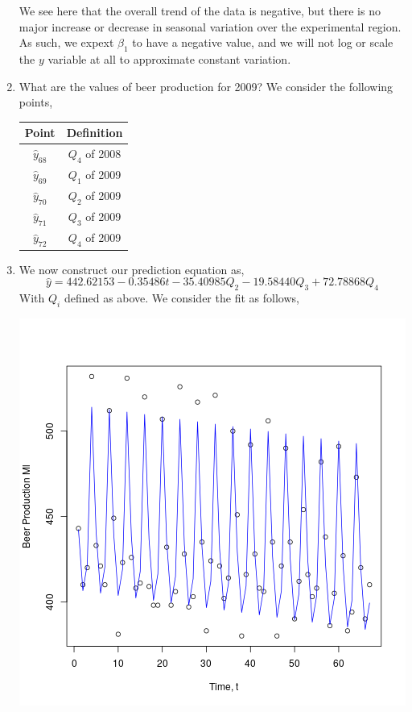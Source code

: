 \documentclass[letterpaper,10pt]{article}
\begin{document}
\begin{enumerate}
We see here that the overall trend of the data is negative, but there is no major increase or decrease in seasonal variation over the experimental region. As such, we expext $\beta_1$ to have a negative value, and we will not log or scale the $y$ variable at all to approximate constant variation.
\item What are the values of beer production for 2009? We consider the following points,
\begin{center}
\begin{tabular}{|c|c|}
\hline
Point & Definition \\\hline
$\hat{y}_{68}$ & $Q_4$ of 2008\\
$\hat{y}_{69}$ & $Q_1$ of 2009\\
$\hat{y}_{70}$ & $Q_2$ of 2009\\
$\hat{y}_{71}$ & $Q_3$ of 2009\\
$\hat{y}_{72}$ & $Q_4$ of 2009\\\hline
\end{tabular}
\end{center}
\item We now construct our prediction equation as,
\[\hat{y}=442.62153-0.35486t-35.40985Q_2-19.58440Q_3+72.78868Q_4\]
With $Q_i$ defined as above. We consider the fit as follows,
\begin{center}
\includegraphics[scale=0.8]{Fitted.png}
\end{center}

\end{enumerate}
\end{document}
